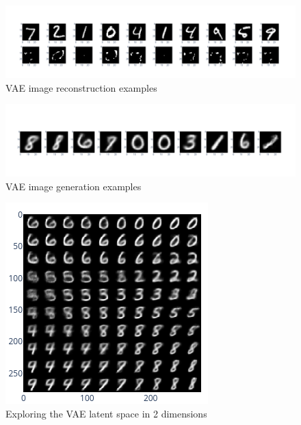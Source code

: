 \begin{figure}
\begin{center}
\includegraphics[width=\textwidth]{vae_sample.png}
\end{center}
\caption{VAE image reconstruction examples}
\label{fig:vae_sample}
\end{figure}

\begin{figure}
\begin{center}
\includegraphics[width=\textwidth]{vae_sample_generative.png}
\end{center}
\caption{VAE image generation examples}
\label{fig:vae_sample_generative}
\end{figure}

\begin{figure}
\begin{center}
\includegraphics[width=.8\textwidth]{vae_sample_generative2.png}
\end{center}
\caption{Exploring the VAE latent space in 2 dimensions}
\label{fig:vae_sample_generative2}
\end{figure}


